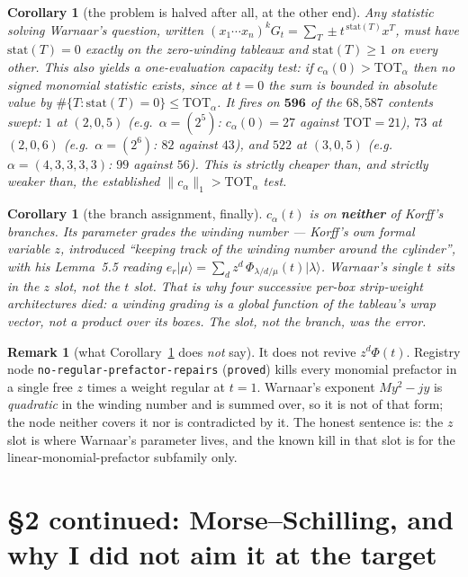 \documentclass[11pt]{article}
\theoremstyle{plain}
\newtheorem{corollary}[theorem]{Corollary}
\theoremstyle{definition}
\newtheorem{remark}[theorem]{Remark}
\begin{document}
\begin{corollary}[the problem is halved after all, at the other end]
Any statistic solving Warnaar's question, written $(x_1\cdots x_n)^kG_t=\sum_T\pm t^{\,\mathrm{stat}(T)}x^T$,
must have $\mathrm{stat}(T)=0$ exactly on the zero-winding tableaux and $\mathrm{stat}(T)\ge1$
on every other. This also yields a one-evaluation capacity test: if
$c_\alpha(0)>\mathrm{TOT}_\alpha$ then no signed monomial statistic exists, since at $t=0$ the
sum is bounded in absolute value by $\#\{T:\mathrm{stat}(T)=0\}\le\mathrm{TOT}_\alpha$. It
fires on $\mathbf{596}$ of the $68{,}587$ contents swept: $1$ at $(2,0,5)$
(e.g.\ $\alpha=(2^5)$: $c_\alpha(0)=27$ against $\mathrm{TOT}=21$), $73$ at $(2,0,6)$
(e.g.\ $\alpha=(2^6)$: $82$ against $43$), and $522$ at $(3,0,5)$
(e.g.\ $\alpha=(4,3,3,3,3)$: $99$ against $56$). This is strictly cheaper than, and strictly
weaker than, the established $\|c_\alpha\|_1>\mathrm{TOT}_\alpha$ test.
\end{corollary}

\begin{corollary}[the branch assignment, finally]\label{cor:branch}
$c_\alpha(t)$ is on \textbf{neither} of Korff's branches. Its parameter grades the winding
number --- Korff's own formal variable $z$, introduced ``keeping track of the winding number
around the cylinder'', with his Lemma~5.5 reading
$e_r\lvert\mu\rangle=\sum_d z^d\,\Phi_{\lambda/d/\mu}(t)\lvert\lambda\rangle$. Warnaar's
single $t$ sits in the $z$ slot, not the $t$ slot. That is why four successive
\emph{per-box strip-weight} architectures died: a winding grading is a global function of the
tableau's wrap vector, not a product over its boxes. The slot, not the branch, was the error.
\end{corollary}

\begin{remark}[what Corollary~\ref{cor:branch} does \emph{not} say]
It does not revive $z^d\Phi(t)$. Registry node \texttt{no-regular-prefactor-repairs}
(\texttt{proved}) kills every monomial prefactor in a single free $z$ times a weight regular
at $t=1$. Warnaar's exponent $My^2-jy$ is \emph{quadratic} in the winding number and is
summed over, so it is not of that form; the node neither covers it nor is contradicted by it.
The honest sentence is: the $z$ slot is where Warnaar's parameter lives, and the known kill
in that slot is for the linear-monomial-prefactor subfamily only.
\end{remark}

\section{\S2 continued: Morse--Schilling, and why I did not aim it at the target}
\end{document}
